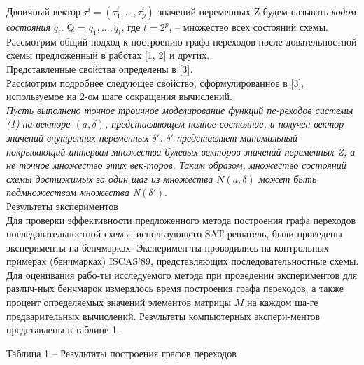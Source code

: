 \documentclass[17pt]{extarticle}
\begin{document}
Двоичный вектор $\tau^i = (\tau_1^i,...,\tau_p^i)$ значений переменных Z будем называть \textit{кодом состояния} $q_i$. Q = ${q_1,...,q_t}$, где $t = 2^p$, – множество всех состояний схемы.  \\
\indent Рассмотрим общий подход к построению графа переходов после-довательностной схемы предложенный в работах [1, 2] и других. \\
\indent Представленные свойства определены в [3]. \\
\indent Рассмотрим подробнее следующее свойство, сформулированное в [3], используемое на 2-ом шаге сокращения вычислений. \\
\indent \textit{Пусть выполнено точное троичное моделирование функций пе-реходов системы (1) на векторе $(a,\delta)$, представляющем полное состояние, и получен вектор значений внутренних переменных $\delta'$. $\delta'$ представляет минимальный покрывающий интервал множества булевых векторов значений переменных Z, а не точное множество этих век-торов. Таким образом, множество состояний схемы достижимых за один шаг из множества $N(a,\delta)$ может быть подмножеством множества N$(\delta').$} \\  
\indent Результаты экспериментов \\
\indent Для проверки эффективности предложенного метода построения графа переходов последовательностной схемы, использующего SAT-решатель, были проведены эксперименты на бенчмарках. Эксперимен-ты проводились на контрольных примерах (бенчмарках) ISCAS’89, представляющих последовательностные схемы. Для оценивания рабо-ты исследуемого метода при проведении экспериментов для различ-ных бенчмарок измерялось время построения графа переходов, а также процент определяемых значений элементов матрицы $M$ на каждом ша-ге предварительных вычислений. Результаты компьютерных экспери-ментов представлены в таблице 1. 

\newpage 

\begin{center}
    Таблица 1 – Результаты построения графов переходов

\end{center}
\end{document}
